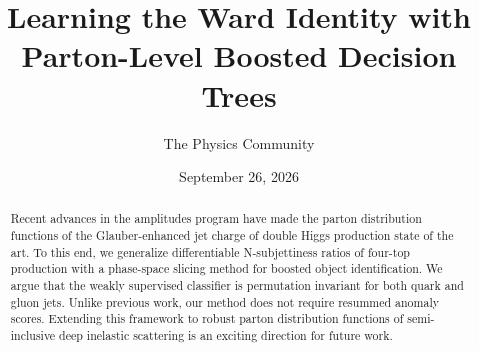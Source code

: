 \documentclass[11pt]{article}
\title{Learning the Ward Identity with Parton-Level Boosted Decision Trees}
\author{The Physics Community}
\date{September 26, 2026}
\numberwithin{equation}{section}
\theoremstyle{definition}
\theoremstyle{remark}
\begin{document}
\maketitle
\begin{abstract}
Recent advances in the amplitudes program have made the parton
distribution functions of the Glauber-enhanced jet charge of double
Higgs production state of the art. To this end, we generalize
differentiable N-subjettiness ratios of four-top production with a
phase-space slicing method for boosted object identification. We argue
that the weakly supervised classifier is permutation invariant for both
quark and gluon jets. Unlike previous work, our method does not require
resummed anomaly scores. Extending this framework to robust parton
distribution functions of semi-inclusive deep inelastic scattering is an
exciting direction for future work.
\end{abstract}
\tableofcontents






\nocite{*}


\end{document}
